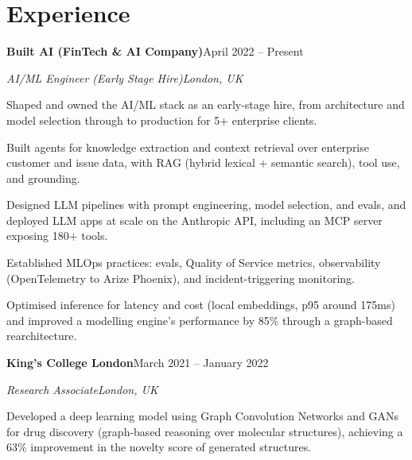 \documentclass[10pt,a4paper]{article}
\newcommand{\entry}[4]{%
  {\color{company}\bfseries #1}\hfill {\color{muted}#2}\par
  \vspace{1pt}
  {\itshape #3}\hfill {\color{muted}\itshape #4}\par
  \vspace{3pt}%
}
\begin{document}
\section{Experience}
\entry{Built AI (FinTech \& AI Company)}{April 2022 -- Present}{AI/ML Engineer (Early Stage Hire)}{London, UK}
\begin{tight}
  \item Shaped and owned the AI/ML stack as an early-stage hire, from architecture and model selection through to production for 5+ enterprise clients.
  \item Built agents for knowledge extraction and context retrieval over enterprise customer and issue data, with RAG (hybrid lexical + semantic search), tool use, and grounding.
  \item Designed LLM pipelines with prompt engineering, model selection, and evals, and deployed LLM apps at scale on the Anthropic API, including an MCP server exposing 180+ tools.
  \item Established MLOps practices: evals, Quality of Service metrics, observability (OpenTelemetry to Arize Phoenix), and incident-triggering monitoring.
  \item Optimised inference for latency and cost (local embeddings, p95 around 175ms) and improved a modelling engine's performance by 85\% through a graph-based rearchitecture.
\end{tight}

\entry{King's College London}{March 2021 -- January 2022}{Research Associate}{London, UK}
\begin{tight}
  \item Developed a deep learning model using Graph Convolution Networks and GANs for drug discovery (graph-based reasoning over molecular structures), achieving a 63\% improvement in the novelty score of generated structures.
\end{tight}

\end{document}
